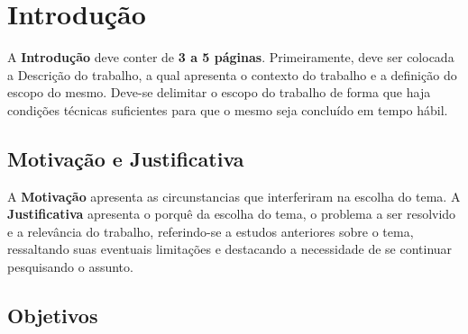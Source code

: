 \chapter{Introdução}
\label{sec-intro}



A \textbf{Introdução} deve conter de \textbf{3 a 5 páginas}. Primeiramente, deve ser colocada a
Descrição do trabalho, a qual apresenta o contexto do trabalho e a definição do escopo do
mesmo. Deve-se delimitar o escopo do trabalho de forma que haja condições
técnicas suficientes para que o mesmo seja concluído em tempo hábil.


\section{Motivação e Justificativa}
\label{sec-intro-motjus}

A \textbf{Motivação} apresenta as circunstancias que interferiram na escolha do tema.
A \textbf{Justificativa} apresenta o porquê da escolha do tema, o problema a ser resolvido
e a relevância do trabalho, referindo-se a estudos anteriores sobre o tema, ressaltando
suas eventuais limitações e destacando a necessidade de se continuar pesquisando o
assunto.

\section{Objetivos}
\label{sec-intro-obj}




